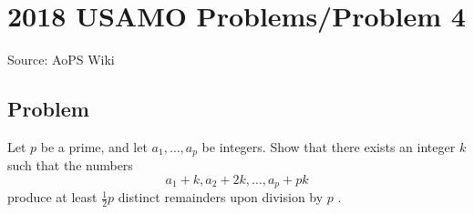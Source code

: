 \documentclass[12pt]{article}
\begin{document}
\section*{{2018 USAMO Problems/Problem 4}}
Source: AoPS Wiki

\subsection*{Problem}
Let $p$ be a prime, and let $a_1, \dots, a_p$ be integers. Show that there exists an integer $k$ such that the numbers \[a_1 + k, a_2 + 2k, \dots, a_p + pk\] produce at least $\tfrac{1}{2} p$ distinct remainders upon division by $p$ .
\end{document}
